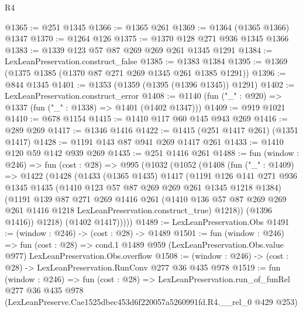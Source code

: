 \begin{lexlean}{R4}
\begin{coremodule}
@1365 := @251 @1345
@1366 := @1365 @261
@1369 := @1364 (@1365 @1366) @1347
@1370 := @1264 @126
@1375 := @1370 @128 @271 @936 @1345 @1366
@1383 := @1339 @123 @57 @87 @269 @269 @261 @1345 @1291
@1384 := LexLeanPreservation.construct_false
@1385 := @1383 @1384
@1395 := @1369 (@1375 @1385 (@1370 @87 @271 @269 @1345 @261 @1385 @1291))
@1396 := @844 @1345
@1401 := @1353 (@1359 (@1395 (@1396 @1345)) @1291)
@1402 := LexLeanPreservation.construct_error
@1408 := @1140 (fun ("_" : @920) => @1337 (fun ("_" : @1338) => @1401 (@1402 @1347)))
@1409 := @919 @1021
@1410 := @678 @1154
@1415 := @1410 @117 @60 @145 @943 @269
@1416 := @289 @269
@1417 := @1346 @1416
@1422 := @1415 (@251 @1417 @261) (@1351 @1417)
@1428 := @1191 @143 @87 @941 @269 @1417 @261
@1433 := @1410 @120 @59 @142 @939 @269
@1435 := @251 @1416 @261
@1488 := fun (window : @246) =>
  fun (cost : @28) =>
  @995
    (@1032
      (@1052
        (@1408
          (fun ("_" : @1409) =>
          @1422
            (@1428
              (@1433
                (@1365 @1435)
                @1417
                (@1191
                  @126
                  @141
                  @271
                  @936
                  @1345
                  @1435
                  (@1410 @123 @57 @87 @269 @269 @261 @1345 @1218 @1384)
                  (@1191
                    @139
                    @87
                    @271
                    @269
                    @1416
                    @261
                    (@1410
                      @136
                      @57
                      @87
                      @269
                      @269
                      @261
                      @1416
                      @1218
                      LexLeanPreservation.construct_true)
                    @1218))
                (@1396 @1416))
              @1218)
            (@1402 @1417)))))
@1489 := LexLeanPreservation.Obs
@1491 := (window : @246) -> (cost : @28) -> @1489
@1501 := fun (window : @246) =>
  fun (cost : @28) =>
  cond.{1} @1489 @959 (LexLeanPreservation.Obs.value @977) LexLeanPreservation.Obs.overflow
@1508 := (window : @246) -> (cost : @28) -> LexLeanPreservation.RunConv @277 @36 @435 @978
@1519 := fun (window : @246) =>
  fun (cost : @28) =>
  LexLeanPreservation.run_of_funRel
    @277
    @36
    @435
    @978
    (LexLeanPreserve.Cae1525dbec453d6f220057a5260991fd.R4.__rel_0 @429 @253)
\end{coremodule}
\end{lexlean}
